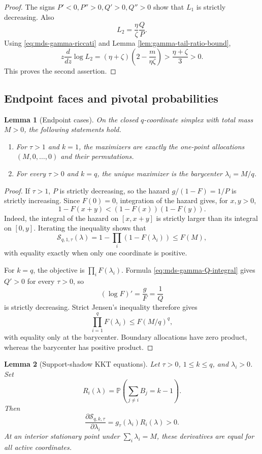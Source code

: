 \documentclass[11pt]{article}
\newtheorem{lemma}{Lemma}
\theoremstyle{definition}
\theoremstyle{remark}
\newcommand{\Pbb}{\mathbb P}
\newcommand{\1}{\mathbf 1}
\begin{document}
\begin{proof}
The signs \(P'<0,P''>0,Q'>0,Q''>0\) show that \(L_1\) is strictly decreasing.  Also
\[
  L_2=\frac{\eta}{\zeta}\frac QP.
\]
Using \eqref{eq:mds-gamma-riccati} and Lemma \ref{lem:gamma-tail-ratio-bound},
\[
  z\frac{d}{dz}\log L_2
  =(\eta+\zeta)\left(2-\frac m{\eta\zeta}\right)
  >\frac{\eta+\zeta}{3}>0.
\]
This proves the second assertion.
\end{proof}

\subsection{Endpoint faces and pivotal probabilities}

\begin{lemma}[Endpoint cases]
\label{lem:mds-endpoint-cases}
On the closed \(q\)-coordinate simplex with total mass \(M>0\), the following statements hold.
\begin{enumerate}
\item For \(\tau>1\) and \(k=1\), the maximizers are exactly the one-point allocations \((M,0,\ldots,0)\) and their permutations.
\item For every \(\tau>0\) and \(k=q\), the unique maximizer is the barycenter \(\lambda_i=M/q\).
\end{enumerate}
\end{lemma}

\begin{proof}
If \(\tau>1\), \(P\) is strictly decreasing, so the hazard \(g/(1-F)=1/P\) is strictly increasing.  Since \(F(0)=0\), integration of the hazard gives, for \(x,y>0\),
\[
  1-F(x+y)<(1-F(x))(1-F(y)).
\]
Indeed, the integral of the hazard on \([x,x+y]\) is strictly larger than its integral on \([0,y]\).  Iterating the inequality shows that
\[
  \mathcal S_{q,1,\tau}(\lambda)
  =1-\prod_i(1-F(\lambda_i))\le F(M),
\]
with equality exactly when only one coordinate is positive.

For \(k=q\), the objective is \(\prod_iF(\lambda_i)\).  Formula \eqref{eq:mds-gamma-Q-integral} gives \(Q'>0\) for every \(\tau>0\), so
\[
  (\log F)'=\frac gF=\frac1Q
\]
is strictly decreasing.  Strict Jensen's inequality therefore gives
\[
  \prod_{i=1}^qF(\lambda_i)\le F(M/q)^q,
\]
with equality only at the barycenter.  Boundary allocations have zero product, whereas the barycenter has positive product.
\end{proof}

\begin{lemma}[Support-shadow KKT equations]
\label{lem:support-shadow-kkt-general}
Let \(\tau>0\), \(1\le k\le q\), and \(\lambda_i>0\).  Set
\[
  R_i(\lambda)=\Pbb\left(\sum_{j\ne i}B_j=k-1\right).
\]
Then
\[
  \frac{\partial\mathcal S_{q,k,\tau}}{\partial\lambda_i}
  =g_\tau(\lambda_i)R_i(\lambda)>0.
\]
At an interior stationary point under \(\sum_i\lambda_i=M\), these derivatives are equal for all active coordinates.
\end{lemma}
\end{document}

